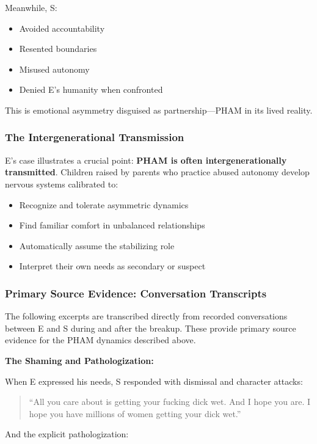 \documentclass[12pt, letterpaper]{article}
\begin{document}
Meanwhile, S:
\begin{itemize}
    \item Avoided accountability
    \item Resented boundaries
    \item Misused autonomy
    \item Denied E's humanity when confronted
\end{itemize}

This is emotional asymmetry disguised as partnership---PHAM in its lived reality.

\subsubsection{The Intergenerational Transmission}

E's case illustrates a crucial point: \textbf{PHAM is often intergenerationally transmitted}. Children raised by parents who practice abused autonomy develop nervous systems calibrated to:

\begin{itemize}
    \item Recognize and tolerate asymmetric dynamics
    \item Find familiar comfort in unbalanced relationships
    \item Automatically assume the stabilizing role
    \item Interpret their own needs as secondary or suspect
\end{itemize}

\subsubsection{Primary Source Evidence: Conversation Transcripts}

The following excerpts are transcribed directly from recorded conversations between E and S during and after the breakup. These provide primary source evidence for the PHAM dynamics described above.

\textbf{The Shaming and Pathologization:}

When E expressed his needs, S responded with dismissal and character attacks:

\begin{quote}
``All you care about is getting your fucking dick wet. And I hope you are. I hope you have millions of women getting your dick wet.''
\end{quote}

And the explicit pathologization:
\end{document}
